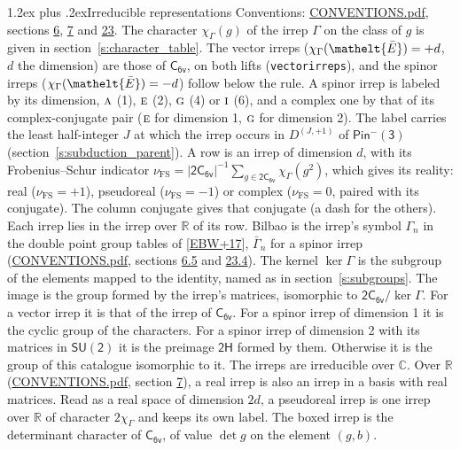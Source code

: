 \documentclass[10pt,a4paper]{article}
\makeatletter
\renewcommand\section{\@startsection{section}{1}{\z@}{-3ex plus -1ex minus -.2ex}%
  {1.2ex plus .2ex}{\normalfont\large\sffamily\bfseries\color{parttitle}}}
\numberwithin{equation}{section}
\newcommand{\eltfont}[1]{{\let\sigma\eltsigma\mathelt{#1}}}
\newcommand{\grp}[1]{\mathsf{#1}}
\newcommand{\irr}[1]{\text{\normalfont\scshape #1}}
\newcommand{\elt}[1]{\eltfont{#1}}
\newcommand{\irrJp}[2]{D^{(#1,#2)}}
\newcommand{\irchar}[1]{\chi_{#1}}
\newcommand{\fsind}{\nu_{\mathrm{FS}}}
\newcommand{\barred}[1]{\bar{#1}}
\makeatother
\begin{document}
\section{Irreducible representations}\label{s:irreps}
Conventions: \href{../../CONVENTIONS.pdf}{CONVENTIONS.pdf}, sections \href{../../../rotation/CONVENTIONS.pdf\#conv.6}{6}, \href{../../../rotation/CONVENTIONS.pdf\#conv.7}{7} and \href{../../CONVENTIONS.pdf\#conv.23}{23}.
\leavevmode\label{n:function.character}\label{n:irrep.Gamma}The character $\irchar{\Gamma}(g)$ of the irrep $\Gamma$ on the class of $g$ is given in section~\ref{s:character_table}. \label{n:index.dimension}The vector irreps ($\irchar{\Gamma}(\elt{\barred{E}}) = +d$, $d$ the dimension) are those of \href{../../../rotation/data/pdf/C6v.pdf}{$\grp{C_{6v}}$}, on both lifts (\texttt{vectorirreps}), and the spinor irreps ($\irchar{\Gamma}(\elt{\barred{E}}) = -d$) follow below the rule. A spinor irrep is labeled by its dimension, $\irr{a}$ (1), $\irr{e}$ (2), $\irr{g}$ (4) or $\irr{i}$ (6), and a complex one by that of its complex-conjugate pair ($\irr{e}$ for dimension 1, $\irr{g}$ for dimension 2). The label carries the least half-integer $J$ at which the irrep occurs in $\irrJp{J}{+1}$ of $\grp{Pin^{-}(3)}$ (section~\ref{s:subduction_parent}).
\leavevmode\label{n:index.frobenius}\label{n:head.irrep}\label{n:head.reality}A row is an irrep of dimension $d$, with its Frobenius--Schur indicator $\fsind = |\grp{2C_{6v}}|^{-1}\allowbreak\sum_{g\in\grp{2C_{6v}}}\irchar{\Gamma}(g^2)$, which gives its reality: real ($\fsind = +1$), pseudoreal ($\fsind = -1$) or complex ($\fsind = 0$, paired with its conjugate). \label{n:head.conjugate}The column conjugate gives that conjugate (a dash for the others). \label{n:head.over.real}Each irrep lies in the irrep over $\mathbb{R}$ of its row. \label{n:head.bilbao}\label{n:irrep.alias.gamma}Bilbao is the irrep's symbol $\Gamma_n$ in the double point group tables of [\href{../../../REFERENCES.pdf\#ref.EBW+17}{EBW+17}], $\bar{\Gamma}_n$ for a spinor irrep (\href{../../CONVENTIONS.pdf}{CONVENTIONS.pdf}, sections \href{../../../rotation/CONVENTIONS.pdf\#conv.6.5}{6.5} and \href{../../CONVENTIONS.pdf\#conv.23.4}{23.4}). \label{n:head.kernel}The kernel $\ker\Gamma$ is the subgroup of the elements mapped to the identity, named as in section~\ref{s:subgroups}. \label{n:head.image}The image is the group formed by the irrep's matrices, isomorphic to $\grp{2C_{6v}}/\ker\Gamma$. For a vector irrep it is that of the irrep of \href{../../../rotation/data/pdf/C6v.pdf}{$\grp{C_{6v}}$}. For a spinor irrep of dimension 1 it is the cyclic group of the characters. For a spinor irrep of dimension 2 with its matrices in $\grp{SU(2)}$ it is the preimage $\grp{2H}$ formed by them. Otherwise it is the group of this catalogue isomorphic to it. The irreps are irreducible over $\mathbb{C}$. Over $\mathbb{R}$ (\href{../../CONVENTIONS.pdf}{CONVENTIONS.pdf}, section \href{../../../rotation/CONVENTIONS.pdf\#conv.7}{7}), a real irrep is also an irrep in a basis with real matrices. Read as a real space of dimension $2d$, a pseudoreal irrep is one irrep over $\mathbb{R}$ of character $2\irchar{\Gamma}$ and keeps its own label. \label{n:mark.determinant}The boxed irrep is the determinant character of \href{../../../rotation/data/pdf/C6v.pdf}{$\grp{C_{6v}}$}, of value $\det g$ on the element $(g, b)$.
\end{document}
